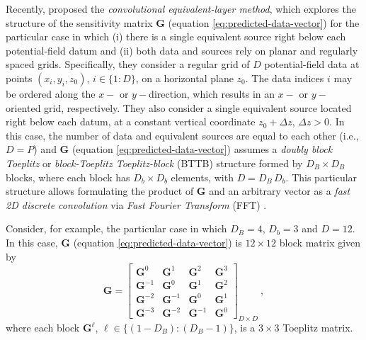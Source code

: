 Recently, \citet{takahashi-etal2020,takahashi-etal2022} proposed the \textit{convolutional equivalent-layer method}, 
which explores the structure of the sensitivity matrix $\mathbf{G}$ (equation \ref{eq:predicted-data-vector}) for 
the particular case in which (i) there is a single equivalent source right below each potential-field
datum and (ii) both data and sources rely on planar and regularly spaced grids.
Specifically, they consider a regular grid of $D$ 
potential-field data at points $(x_{i}, y_{i}, z_{0})$, $i \in \{1:D\}$, on a horizontal plane $z_{0}$.
The data indices $i$ may be ordered along the $x-$ or $y-$direction, which results in an
$x-$ or $y-$oriented grid, respectively.
They also consider a single equivalent source located right below each datum, at a constant vertical coordinate
$z_{0} + \Delta z$, $\Delta z > 0$.
In this case, the number of data and equivalent sources are equal to each other (i.e., $D = P$) and
$\mathbf{G}$ (equation \ref{eq:predicted-data-vector}) assumes a \textit{doubly block Toeplitz} \cite[][p. 28]{jain1989} or 
\textit{block-Toeplitz Toeplitz-block} (BTTB) \cite[][p. 67]{chan-jin2007} structure formed by $D_{B} \times D_{B}$
blocks, where each block has $D_{b} \times D_{b}$ elements, with $D = D_{B} \, D_{b}$.
This particular structure allows formulating the product
of $\mathbf{G}$ and an arbitrary vector as a \textit{fast 2D discrete convolution} via 
\textit{Fast Fourier Transform} (FFT) \cite[][section 4.2]{vanloan1992}.

Consider, for example, the particular case in which $D_{B} = 4$, $D_{b} = 3$ and $D = 12$. In this case,
$\mathbf{G}$ (equation \ref{eq:predicted-data-vector}) is $12 \times 12$ block matrix given by
\begin{equation}
	\mathbf{G} = \begin{bmatrix}
		\mathbf{G}^{0} & \mathbf{G}^{1} & \mathbf{G}^{2} & \mathbf{G}^{3} \\
		\mathbf{G}^{-1} & \mathbf{G}^{0} & \mathbf{G}^{1} & \mathbf{G}^{2} \\
		\mathbf{G}^{-2} & \mathbf{G}^{-1} & \mathbf{G}^{0} & \mathbf{G}^{1} \\
		\mathbf{G}^{-3} & \mathbf{G}^{-2} & \mathbf{G}^{-1} & \mathbf{G}^{0}
	\end{bmatrix}_{D \times D} \: ,
	\label{eq:matrix-G-BTTB}
\end{equation}
where each block $\mathbf{G}^{\ell}$, $\ell \in \{ (1 - D_{B}) : (D_{B} - 1) \}$, is a $3 \times 3$ Toeplitz matrix.

